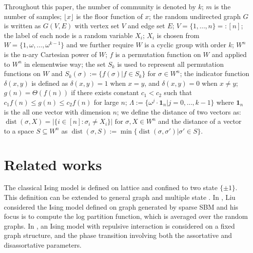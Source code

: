 \documentclass[journal]{IEEEtran}
\newcommand{\1}{\mathbbm{1}}
\DeclareMathOperator{\dist}{dist}
\begin{document}
Throughout this paper, the number of community is denoted by $k$; $m$ is the number of samples; $\lfloor x \rfloor$ is the floor function of $x$; the random undirected graph $G$ is written as $G(V,E)$ with vertex set $V$ and edge set $E$;
$V=\{1,\dots, n\} =: [n]$;
the label of each node is a random variable $X_i$; $X_i$ is chosen from $W= \{1, \omega, \dots, \omega^{k-1}\}$ and we further require $W$
is a cyclic group with order $k$; $W^n$ is the n-ary Cartesian power of $W$;
$f$ is a permutation function on $W$ and applied to $W^n$ in elementwise way;
the set $S_k$ is used to represent all permutation functions on $W$ and $S_k(\sigma):=\{f(\sigma)| f\in S_k\}$ for $\sigma \in W^n$;
the indicator function $\delta(x,y)$ is defined as
$\delta(x,y) = 1 $ when $x=y$, and $\delta(x,y)=0$ when $x\neq y$;
$g(n) = \Theta(f(n))$ if there exists constant $c_1 < c_2$ such that $c_1 f(n) \leq g(n) \leq c_2 f(n)$
for large $n$;
$\Lambda := \{ \omega^j  \cdot \mathbf{1}_n | j=0, \dots,k-1\}$
where $\mathbf{1}_n$ is the all one vector with dimension $n$;
we define the distance of two vectors as:
$\dist(\sigma, X)
=|\{i\in[n]:\sigma_i\neq X_i\}| \textrm{ for } \sigma,X\in W^n
$ and the distance of a vector to a space $S\subseteq W^n$
as
$\dist(\sigma,S)
:=\min\{\dist(\sigma, \sigma') | \sigma' \in S\}
$.
\section{Related works}
The classical Ising model is defined on lattice and confined to two state $\{\pm 1\}$. This definition
can be extended to general graph and multiple state \cite{potts1952some}. In \cite{liu2017log}, Liu considered
the Ising model defined on graph generated by sparse SBM and his focus is to compute the log partition function,
which is averaged over the random graphs. In \cite{berthet2019exact}, an Ising model with repulsive interaction
is considered on a fixed graph structure, and the phase transition involving both the assortative and disassortative
parameters.
\end{document}
